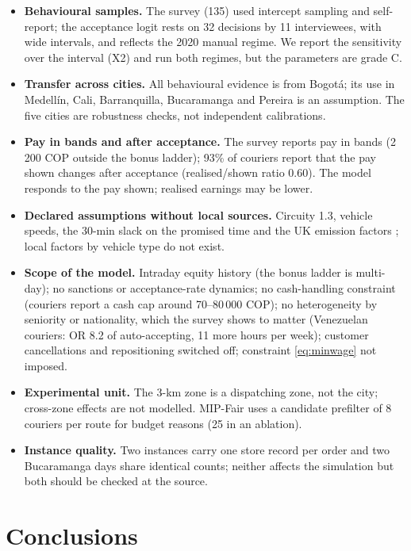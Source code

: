 \documentclass[preprint,12pt,authoryear]{elsarticle}%
\begin{document}
\begin{itemize}
\item \textbf{Behavioural samples.} The survey (135) used intercept sampling and self-report; the acceptance logit rests on 32 decisions by 11 interviewees, with wide intervals, and reflects the 2020 manual regime. We report the sensitivity over the interval (X2) and run both regimes, but the parameters are grade C.
\item \textbf{Transfer across cities.} All behavioural evidence is from Bogot\'a; its use in Medell\'in, Cali, Barranquilla, Bucaramanga and Pereira is an assumption. The five cities are robustness checks, not independent calibrations.
\item \textbf{Pay in bands and after acceptance.} The survey reports pay in bands (2\,200 COP outside the bonus ladder); 93\% of couriers report that the pay shown changes after acceptance (realised/shown ratio 0.60). The model responds to the pay shown; realised earnings may be lower.
\item \textbf{Declared assumptions without local sources.} Circuity 1.3, vehicle speeds, the 30-min slack on the promised time and the UK emission factors \citep{defra2023factors}; local factors by vehicle type do not exist.
\item \textbf{Scope of the model.} Intraday equity history (the bonus ladder is multi-day); no sanctions or acceptance-rate dynamics; no cash-handling constraint (couriers report a cash cap around 70--80\,000 COP); no heterogeneity by seniority or nationality, which the survey shows to matter (Venezuelan couriers: OR 8.2 of auto-accepting, 11 more hours per week); customer cancellations and repositioning switched off; constraint \eqref{eq:minwage} not imposed.
\item \textbf{Experimental unit.} The 3-km zone is a dispatching zone, not the city; cross-zone effects are not modelled. MIP-Fair uses a candidate prefilter of 8 couriers per route for budget reasons (25 in an ablation).
\item \textbf{Instance quality.} Two instances carry one store record per order and two Bucaramanga days share identical counts; neither affects the simulation but both should be checked at the source.
\end{itemize}

\section{Conclusions}
\label{sec:conclusions}
\end{document}
